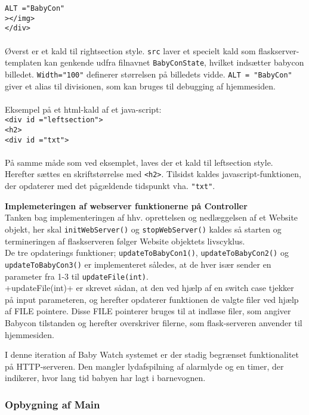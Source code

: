 \verb+ALT ="BabyCon"+\\
\verb+></img>+\\
\verb+</div>+\\
\\Øverst er et kald til rightsection style. \verb+src+ laver et specielt kald som flaskserver-templaten kan genkende udfra filnavnet \verb+BabyConState+, hvilket indsætter babycon billedet. \verb+Width="100"+ definerer størrelsen på billedets vidde. \verb+ALT = "BabyCon"+ giver et alias til divisionen, som kan bruges til debugging af hjemmesiden.\\
\\Eksempel på et html-kald af et java-script:\\
\verb+<div id ="leftsection">+ \\
\verb+<h2>+ \\
\verb+<div id ="txt">+ \\
\\På samme måde som ved eksemplet, laves der et kald til leftsection style. Herefter sættes en skriftstørrelse med \verb+<h2>+. Tilsidst kaldes javascript-funktionen, der opdaterer med det pågældende tidspunkt vha. \verb+"txt"+.

\textbf{Implemeteringen af webserver funktionerne på Controller} \\
Tanken bag implementeringen af hhv. oprettelsen og nedlæggelsen af et Website objekt, her skal \verb+initWebServer()+ og \verb+stopWebServer()+ kaldes så starten og termineringen af flaskserveren følger Website objektets livscyklus. \\ 
De tre opdaterings funktioner; \verb+updateToBabyCon1()+, \verb+updateToBabyCon2()+ og \verb+updateToBabyCon3()+ er implementeret således, at de hver især sender en parameter fra 1-3 til \verb+updateFile(int)+. \\ 
+updateFile(int)+ er skrevet sådan, at den ved hjælp af en switch case tjekker på input parameteren, og herefter opdaterer funktionen de valgte filer ved hjælp af FILE pointere. Disse FILE pointerer bruges til at indlæse filer, som angiver Babycon tilstanden og herefter overskriver filerne, som flask-serveren anvender til hjemmesiden.

I denne iteration af Baby Watch systemet er der stadig begrænset funktionalitet på HTTP-serveren. Den mangler lydafspilning af alarmlyde og en timer, der indikerer, hvor lang tid babyen har lagt i barnevognen.

\subsubsection*{Opbygning af Main}

